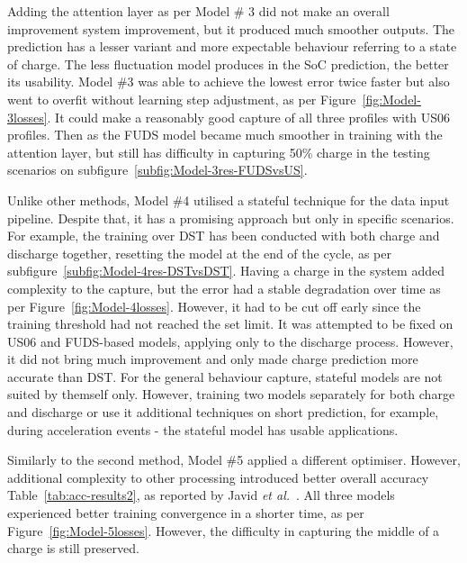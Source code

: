 %
%
Adding the attention layer as per Model \# 3 did not make an overall improvement system improvement, but it produced much smoother outputs.
The prediction has a lesser variant and more expectable behaviour referring to a state of charge.
The less fluctuation model produces in the SoC prediction, the better its usability.
Model \#3 was able to achieve the lowest error twice faster but also went to overfit without learning step adjustment, as per Figure~\ref{fig:Model-3losses}.
It could make a reasonably good capture of all three profiles with US06 profiles.
Then as the FUDS model became much smoother in training with the attention layer, but still has difficulty in capturing 50\% charge in the testing scenarios on subfigure~\ref{subfig:Model-3res-FUDSvsUS}. 

%
%
Unlike other methods, Model \#4 utilised a stateful technique for the data input pipeline.
Despite that, it has a promising approach but only in specific scenarios.
For example, the training over DST has been conducted with both charge and discharge together, resetting the model at the end of the cycle, as per subfigure~\ref{subfig:Model-4res-DSTvsDST}.
Having a charge in the system added complexity to the capture, but the error had a stable degradation over time as per Figure~\ref{fig:Model-4losses}.
However, it had to be cut off early since the training threshold had not reached the set limit.
It was attempted to be fixed on US06 and FUDS-based models, applying only to the discharge process.
However, it did not bring much improvement and only made charge prediction more accurate than DST.
For the general behaviour capture, stateful models are not suited by themself only.
However, training two models separately for both charge and discharge or use it additional techniques on short prediction, for example, during acceleration events - the stateful model has usable applications.

%
%
Similarly to the second method, Model \#5 applied a different optimiser.
However, additional complexity to other processing introduced better overall accuracy Table~\ref{tab:acc-results2}, as reported by Javid \textit{et al.}~\cite{javid_adaptive_2020}.
All three models experienced better training convergence in a shorter time, as per Figure~\ref{fig:Model-5losses}.
However, the difficulty in capturing the middle of a charge is still preserved.

